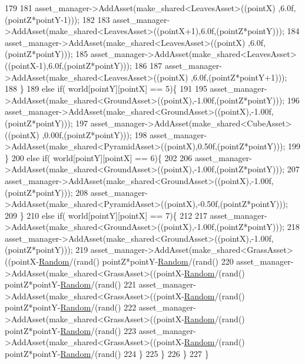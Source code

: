 \begin{DoxyCode}
179 
181             asset\_manager->AddAsset(make\_shared<LeavesAsset>((pointX)  ,6.0f,(pointZ*pointY-1)));
182 
183             asset\_manager->AddAsset(make\_shared<LeavesAsset>((pointX+1),6.0f,(pointZ*pointY)));
184             asset\_manager->AddAsset(make\_shared<LeavesAsset>((pointX)  ,6.0f,(pointZ*pointY)));
185             asset\_manager->AddAsset(make\_shared<LeavesAsset>((pointX-1),6.0f,(pointZ*pointY)));
186 
187             asset\_manager->AddAsset(make\_shared<LeavesAsset>((pointX)  ,6.0f,(pointZ*pointY+1)));
188    \}
189     \textcolor{keywordflow}{else} \textcolor{keywordflow}{if}( world[pointY][pointX] == 5)\{
191 
195             asset\_manager->AddAsset(make\_shared<GroundAsset>((pointX),-1.00f,(pointZ*pointY)));
196             asset\_manager->AddAsset(make\_shared<GroundAsset>((pointX),-1.00f,(pointZ*pointY)));
197             asset\_manager->AddAsset(make\_shared<CubeAsset>((pointX)  ,0.00f,(pointZ*pointY)));
198             asset\_manager->AddAsset(make\_shared<PyramidAsset>((pointX),0.50f,(pointZ*pointY)));
199    \}
200     \textcolor{keywordflow}{else} \textcolor{keywordflow}{if}( world[pointY][pointX] == 6)\{
202 
206             asset\_manager->AddAsset(make\_shared<GroundAsset>((pointX),-1.00f,(pointZ*pointY)));
207             asset\_manager->AddAsset(make\_shared<GroundAsset>((pointX),-1.00f,(pointZ*pointY)));
208             asset\_manager->AddAsset(make\_shared<PyramidAsset>((pointX),-0.50f,(pointZ*pointY)));
209    \}
210     \textcolor{keywordflow}{else} \textcolor{keywordflow}{if}( world[pointY][pointX] == 7)\{
212 
217             asset\_manager->AddAsset(make\_shared<GroundAsset>((pointX),-1.00f,(pointZ*pointY)));
218             asset\_manager->AddAsset(make\_shared<GroundAsset>((pointX),-1.00f,(pointZ*pointY)));
219             asset\_manager->AddAsset(make\_shared<GrassAsset>((pointX-\hyperlink{classGameWorld_a56652cc9880b3ba1be61395066c863c3}{Random}/(rand() %
      pointZ*pointY-\hyperlink{classGameWorld_a56652cc9880b3ba1be61395066c863c3}{Random}/(rand()%
220             asset\_manager->AddAsset(make\_shared<GrassAsset>((pointX-\hyperlink{classGameWorld_a56652cc9880b3ba1be61395066c863c3}{Random}/(rand() %
      pointZ*pointY-\hyperlink{classGameWorld_a56652cc9880b3ba1be61395066c863c3}{Random}/(rand() %
221             asset\_manager->AddAsset(make\_shared<GrassAsset>((pointX-\hyperlink{classGameWorld_a56652cc9880b3ba1be61395066c863c3}{Random}/(rand() %
      pointZ*pointY-\hyperlink{classGameWorld_a56652cc9880b3ba1be61395066c863c3}{Random}/(rand() %
222             asset\_manager->AddAsset(make\_shared<GrassAsset>((pointX-\hyperlink{classGameWorld_a56652cc9880b3ba1be61395066c863c3}{Random}/(rand() %
      pointZ*pointY-\hyperlink{classGameWorld_a56652cc9880b3ba1be61395066c863c3}{Random}/(rand() %
223             asset\_manager->AddAsset(make\_shared<GrassAsset>((pointX-\hyperlink{classGameWorld_a56652cc9880b3ba1be61395066c863c3}{Random}/(rand() %
      pointZ*pointY-\hyperlink{classGameWorld_a56652cc9880b3ba1be61395066c863c3}{Random}/(rand() %
224    \}
225   \}
226  \}  
227 \}
\end{DoxyCode}


